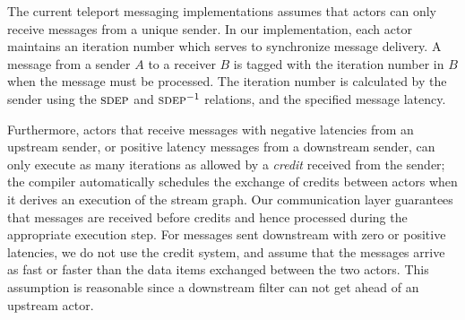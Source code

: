 The current teleport messaging implementations assumes that actors
can only receive messages from a unique sender.
In our implementation, each actor maintains an iteration number which
serves to synchronize message delivery. A message from a sender $A$ to
a receiver $B$ is tagged with the iteration number in $B$ when the
message must be processed. The iteration number is calculated by the
sender using the $\textsc{sdep}$ and $\textsc{sdep}^{-1}$ relations, and the specified
message latency.

Furthermore, actors that receive messages with negative latencies from
an upstream sender, or positive latency messages from a downstream sender, 
can only execute as many iterations as allowed by a
{\it credit} received from the sender; the compiler automatically
schedules the exchange  of credits between actors when it derives an
execution of the stream graph. Our communication layer guarantees that
messages are received before credits and hence processed during the
appropriate execution step.
For messages sent downstream with zero or positive latencies, we
do not use the credit system, and assume that the messages arrive as fast or
faster than the data items exchanged between the two actors. This
assumption is reasonable since a downstream filter can not get 
ahead of an upstream actor.

                                                                                                     
